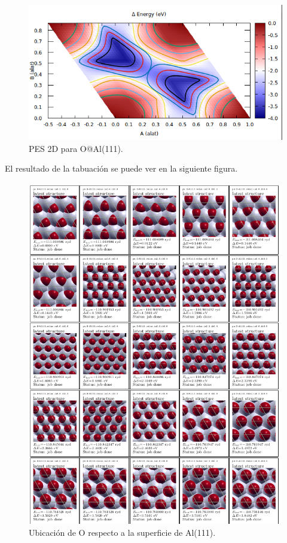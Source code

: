     \begin{figure}[H]
        \centering
        \includegraphics[scale = 0.5]{figs/D3/PES_2D.png}
        \caption{PES 2D para O@Al(111).}
    \end{figure}

  El resultado de la tabuación se puede ver en la siguiente figura.

  \begin{figure}[H]
      \centering
      \includegraphics[scale = 0.5]{figs/D3/tabulate.png}
      \caption{Ubicación de O respecto a la superficie de Al(111).}
  \end{figure}

